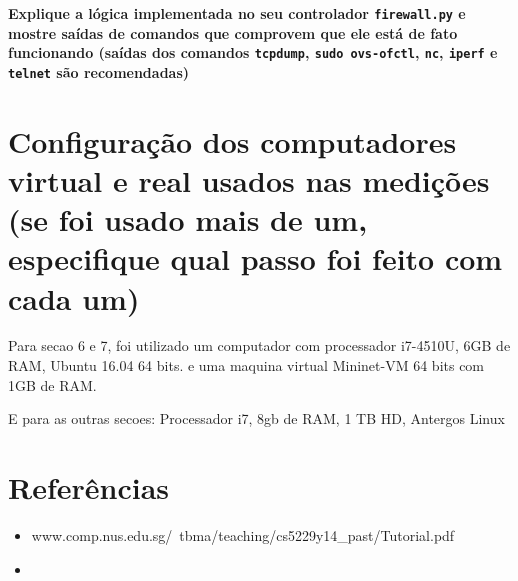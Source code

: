\documentclass[12pt,letterpaper]{article}
\begin{document}
\textbf{Explique a lógica implementada no seu controlador
\texttt{firewall.py} e mostre saídas de comandos que comprovem que ele
está de fato funcionando (saídas dos comandos \texttt{tcpdump},
\texttt{sudo ovs-ofctl}, \texttt{nc}, \texttt{iperf} e \texttt{telnet}
são recomendadas)}

\section{Configuração dos computadores virtual e real usados nas
medições (se foi usado mais de um, especifique qual passo foi feito
com cada um)}
Para secao 6 e 7, foi utilizado um computador com processador i7-4510U, 6GB de RAM, Ubuntu 16.04 64 bits.
e uma maquina virtual Mininet-VM 64 bits com 1GB de RAM.

E para as outras secoes:
Processador i7, 8gb de RAM, 1 TB HD, Antergos Linux

\section{Referências}

\begin{itemize}
   \item www.comp.nus.edu.sg/~tbma/teaching/cs5229y14\_past/Tutorial.pdf
   \item
\end{itemize}
\end{document}

